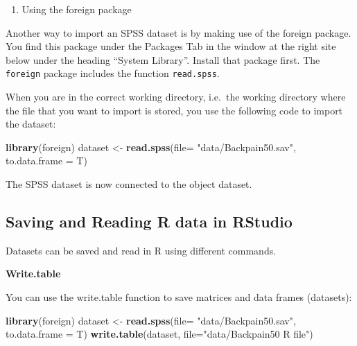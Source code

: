 \documentclass[]{book}
\newenvironment{Shaded}{\begin{snugshade}}{\end{snugshade}}
\newcommand{\KeywordTok}[1]{\textcolor[rgb]{0.13,0.29,0.53}{\textbf{#1}}}
\newcommand{\DataTypeTok}[1]{\textcolor[rgb]{0.13,0.29,0.53}{#1}}
\newcommand{\StringTok}[1]{\textcolor[rgb]{0.31,0.60,0.02}{#1}}
\newcommand{\NormalTok}[1]{#1}
\providecommand{\tightlist}{%
  \setlength{\itemsep}{0pt}\setlength{\parskip}{0pt}}
\begin{document}
\begin{enumerate}
\def\labelenumi{\arabic{enumi}.}
\setcounter{enumi}{1}
\tightlist
\item
  Using the foreign package
\end{enumerate}

Another way to import an SPSS dataset is by making use of the foreign
package. You find this package under the Packages Tab in the window at
the right site below under the heading ``System Library''. Install that
package first. The \texttt{foreign} package includes the function
\texttt{read.spss}.

When you are in the correct working directory, i.e.~the working
directory where the file that you want to import is stored, you use the
following code to import the dataset:

\begin{Shaded}
\begin{Highlighting}[]
\KeywordTok{library}\NormalTok{(foreign)}
\NormalTok{dataset <-}\StringTok{ }\KeywordTok{read.spss}\NormalTok{(}\DataTypeTok{file=} \StringTok{"data/Backpain50.sav"}\NormalTok{, }\DataTypeTok{to.data.frame =}\NormalTok{ T)}
\end{Highlighting}
\end{Shaded}

The SPSS dataset is now connected to the object dataset.

\subsection{Saving and Reading R data in
RStudio}\label{saving-and-reading-r-data-in-rstudio}

Datasets can be saved and read in R using different commands.

\textbf{Write.table}

You can use the write.table function to save matrices and data frames
(datasets):

\begin{Shaded}
\begin{Highlighting}[]
\KeywordTok{library}\NormalTok{(foreign)}
\NormalTok{dataset <-}\StringTok{ }\KeywordTok{read.spss}\NormalTok{(}\DataTypeTok{file=} \StringTok{"data/Backpain50.sav"}\NormalTok{, }\DataTypeTok{to.data.frame =}\NormalTok{ T)}
\KeywordTok{write.table}\NormalTok{(dataset, }\DataTypeTok{file=}\StringTok{"data/Backpain50 R file"}\NormalTok{)}
\end{Highlighting}
\end{Shaded}
\end{document}
